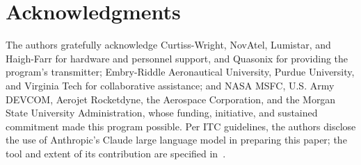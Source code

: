 \documentclass[12pt,letterpaper]{article}
\begin{document}
\section{Acknowledgments}

The authors gratefully acknowledge Curtiss-Wright, NovAtel, Lumistar, and Haigh-Farr for
hardware and personnel support, and Quasonix for providing the program's transmitter;
Embry-Riddle Aeronautical University, Purdue University, and Virginia Tech for collaborative
assistance; and NASA MSFC, U.S. Army DEVCOM, Aerojet Rocketdyne, the Aerospace Corporation,
and the Morgan State University Administration, whose funding, initiative, and sustained
commitment made this program possible. Per ITC guidelines, the authors disclose the use of
Anthropic's Claude large language model in preparing this paper; the tool and extent of its
contribution are specified in~\cite{claude2026}.

{\footnotesize
\setlength{\bibsep}{0.5pt plus 0.5pt}

}
\end{document}
